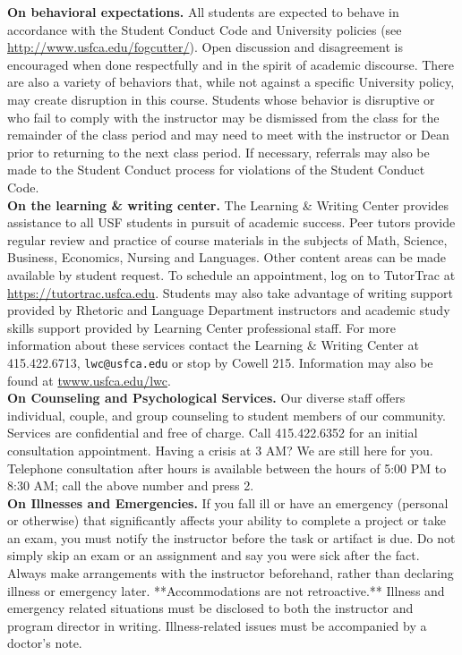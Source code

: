 \documentclass[11pt]{article}
\begin{document}
\noindent \textbf{On behavioral expectations.} All students are expected to behave in accordance with the Student Conduct Code and University policies (see \url{http://www.usfca.edu/fogcutter/}).  Open discussion and disagreement is encouraged when done respectfully and in the spirit of academic discourse. There are also a variety of behaviors that, while not against a specific University policy, may create disruption in this course. Students whose behavior is disruptive or who fail to comply with the instructor may be dismissed from the class for the remainder of the class period and may need to meet with the instructor or Dean prior to returning to the next class period. If necessary, referrals may also be made to the Student Conduct process for violations of the Student Conduct Code. \\

\noindent \textbf{On the learning \& writing center.} The Learning \& Writing Center provides assistance to all USF students in pursuit of academic success. Peer tutors provide regular review and practice of course materials in the subjects of Math, Science, Business, Economics, Nursing and Languages. Other content areas can be made available by student request. To schedule an appointment, log on to TutorTrac at \url{https://tutortrac.usfca.edu}. Students may also take advantage of writing support provided by Rhetoric and Language Department instructors and academic study skills support provided by Learning Center professional staff. For more information about these services contact the Learning \& Writing Center at 415.422.6713, \verb!lwc@usfca.edu! or stop by Cowell 215. Information may also be found at \url{twww.usfca.edu/lwc}.\\

\noindent \textbf{On Counseling and Psychological Services.}  Our diverse staff offers individual, couple, and group counseling to student members of our community. Services are confidential and free of charge. Call 415.422.6352 for an initial consultation appointment. Having a crisis at 3 AM? We are still here for you. Telephone consultation after hours is available between the hours of 5:00 PM to 8:30 AM; call the above number and press 2.\\

\noindent \textbf{On Illnesses and Emergencies.} If you fall ill or have an emergency (personal or otherwise) that significantly affects your ability to complete a project or take an exam, you must notify the instructor before the task or artifact is due. Do not simply skip an exam or an assignment and say you were sick after the fact. Always make arrangements with the instructor beforehand, rather than declaring illness or emergency later. **Accommodations are not retroactive.**  Illness and emergency related situations must be disclosed to both the instructor and program director in writing. Illness-related issues must be accompanied by a doctor’s note.\\
\end{document}
